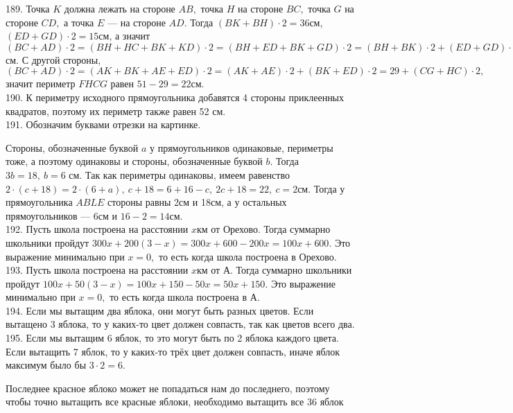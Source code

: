 189. Точка $K$ должна лежать на стороне $AB,$ точка $H$ на стороне $BC,$ точка $G$ на стороне $CD,$ а точка $E$ --- на стороне $AD.$ Тогда $(BK+BH)\cdot2=36$см, $(ED+GD)\cdot2=15$см, а значит $(BC+AD)\cdot2=(BH+HC+BK+KD)\cdot2=(BH+ED+BK+GD)\cdot2=(BH+BK)\cdot2+(ED+GD)\cdot2=36+15=51$см. С другой стороны, $(BC+AD)\cdot2=(AK+BK+AE+ED)\cdot2=(AK+AE)\cdot2+(BK+ED)\cdot2=29+(CG+HC)\cdot2,$ значит периметр $FHCG$ равен $51-29=22$см.\\
190. К периметру исходного прямоугольника добавятся 4 стороны приклеенных квадратов, поэтому их периметр также равен 52 см.\\
191. Обозначим буквами отрезки на картинке.
\begin{center}
\begin{figure}[ht!]
\end{figure}
\end{center}
Стороны, обозначенные буквой $a$ у прямоугольников одинаковые, периметры тоже, а поэтому одинаковы и стороны, обозначенные буквой $b.$ Тогда $3b=18,\ b=6$ см. Так как периметры одинаковы, имеем равенство $2\cdot(c+18)=2\cdot(6+a),\ c+18=6+16-c,\ 2c+18=22,\ c=2$см. Тогда у прямоугольника $ABLE$ стороны равны 2см и 18см, а у остальных прямоугольников --- 6см и $16-2=14$см.\\
192. Пусть школа построена на расстоянии $x$км от Орехово. Тогда суммарно школьники пройдут $300x+200(3-x)=300x+600-200x=100x+600.$ Это выражение минимально при $x=0,$ то есть когда школа построена в Орехово.\\
193. Пусть школа построена на расстоянии $x$км от А. Тогда суммарно школьники пройдут $100x+50(3-x)=100x+150-50x=50x+150.$ Это выражение минимально при $x=0,$ то есть когда школа построена в А.\\
194. Если мы вытащим два яблока, они могут быть разных цветов. Если вытащено 3 яблока, то у каких-то цвет должен совпасть, так как цветов всего два.\\
195. Если мы вытащим 6 яблок, то это могут быть по 2 яблока каждого цвета. Если вытащить 7 яблок, то у каких-то трёх цвет должен совпасть, иначе яблок максимум было бы $3\cdot2=6.$

Последнее красное яблоко может не попадаться нам до последнего, поэтому чтобы точно вытащить все красные яблоки, необходимо вытащить все 36 яблок

